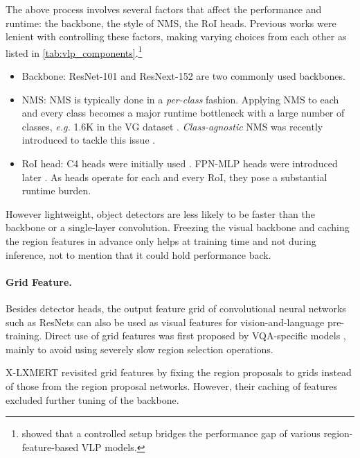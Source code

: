 \documentclass{article}
\begin{document}
The above process involves several factors that affect the performance and runtime: the backbone, the style of NMS, the RoI heads. Previous works were lenient with controlling these factors, making varying choices from each other as listed in \cref{tab:vlp_components}.\footnote{\citet{bugliarello2020multimodal} showed that a controlled setup bridges the performance gap of various region-feature-based VLP models.}

\begin{itemize}
    \item Backbone: ResNet-101 \citep{lu2019vilbert,tan2019lxmert,su2019vl} and ResNext-152 \citep{li2019visualbert,li2020unicoder,zhang2021vinvl} are two commonly used backbones.
    \item NMS: NMS is typically done in a \textit{per-class} fashion. Applying NMS to each and every class becomes a major runtime bottleneck with a large number of classes, \textit{e.g.} 1.6K in the VG dataset \citep{jiang2020defense}. \textit{Class-agnostic} NMS was recently introduced to tackle this issue \citep{zhang2021vinvl}.
    \item RoI head: C4 heads were initially used \citep{anderson2018bottom}. FPN-MLP heads were introduced later \citep{jiang2018pythia}. As heads operate for each and every RoI, they pose a substantial runtime burden.
\end{itemize}

However lightweight, object detectors are less likely to be faster than the backbone or a single-layer convolution. Freezing the visual backbone and caching the region features in advance only helps at training time and not during inference, not to mention that it could hold performance back.

\paragraph{Grid Feature.}
Besides detector heads, the output feature grid of convolutional neural networks such as ResNets can also be used as visual features for vision-and-language pre-training.
Direct use of grid features was first proposed by VQA-specific models \citep{jiang2020defense, nguyen2020revisiting}, mainly to avoid using severely slow region selection operations.

X-LXMERT \citep{cho2020x} revisited grid features by fixing the region proposals to grids instead of those from the region proposal networks. However, their caching of features excluded further tuning of the backbone.
\end{document}
